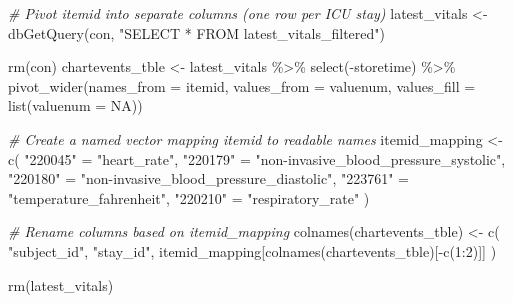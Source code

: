 \documentclass[
]{article}
\newenvironment{Shaded}{\begin{snugshade}}{\end{snugshade}}
\newcommand{\AttributeTok}[1]{\textcolor[rgb]{0.77,0.63,0.00}{#1}}
\newcommand{\CommentTok}[1]{\textcolor[rgb]{0.56,0.35,0.01}{\textit{#1}}}
\newcommand{\ConstantTok}[1]{\textcolor[rgb]{0.00,0.00,0.00}{#1}}
\newcommand{\DecValTok}[1]{\textcolor[rgb]{0.00,0.00,0.81}{#1}}
\newcommand{\FunctionTok}[1]{\textcolor[rgb]{0.00,0.00,0.00}{#1}}
\newcommand{\NormalTok}[1]{\textcolor[rgb]{0.00,0.00,0.00}{#1}}
\newcommand{\OtherTok}[1]{\textcolor[rgb]{0.56,0.35,0.01}{#1}}
\newcommand{\SpecialCharTok}[1]{\textcolor[rgb]{0.00,0.00,0.00}{#1}}
\newcommand{\StringTok}[1]{\textcolor[rgb]{0.31,0.60,0.02}{#1}}
\begin{document}
\begin{Shaded}
\begin{Highlighting}[]
\CommentTok{\# Pivot \textasciigrave{}itemid\textasciigrave{} into separate columns (one row per ICU stay)}
\NormalTok{latest\_vitals }\OtherTok{\textless{}{-}} \FunctionTok{dbGetQuery}\NormalTok{(con, }\StringTok{"SELECT * FROM latest\_vitals\_filtered"}\NormalTok{)}

\FunctionTok{rm}\NormalTok{(con)}
\NormalTok{chartevents\_tble }\OtherTok{\textless{}{-}}\NormalTok{ latest\_vitals }\SpecialCharTok{\%\textgreater{}\%}
  \FunctionTok{select}\NormalTok{(}\SpecialCharTok{{-}}\NormalTok{storetime) }\SpecialCharTok{\%\textgreater{}\%}
  \FunctionTok{pivot\_wider}\NormalTok{(}\AttributeTok{names\_from =}\NormalTok{ itemid, }\AttributeTok{values\_from =}\NormalTok{ valuenum, }
              \AttributeTok{values\_fill =} \FunctionTok{list}\NormalTok{(}\AttributeTok{valuenum =} \ConstantTok{NA}\NormalTok{))}

\CommentTok{\# Create a named vector mapping \textasciigrave{}itemid\textasciigrave{} to readable names}
\NormalTok{itemid\_mapping }\OtherTok{\textless{}{-}} \FunctionTok{c}\NormalTok{(}
  \StringTok{"220045"} \OtherTok{=} \StringTok{"heart\_rate"}\NormalTok{,}
  \StringTok{"220179"} \OtherTok{=} \StringTok{"non{-}invasive\_blood\_pressure\_systolic"}\NormalTok{,}
  \StringTok{"220180"} \OtherTok{=} \StringTok{"non{-}invasive\_blood\_pressure\_diastolic"}\NormalTok{,}
  \StringTok{"223761"} \OtherTok{=} \StringTok{"temperature\_fahrenheit"}\NormalTok{,}
  \StringTok{"220210"} \OtherTok{=} \StringTok{"respiratory\_rate"}
\NormalTok{)}

\CommentTok{\# Rename columns based on \textasciigrave{}itemid\_mapping\textasciigrave{}}
\FunctionTok{colnames}\NormalTok{(chartevents\_tble) }\OtherTok{\textless{}{-}} \FunctionTok{c}\NormalTok{(}
  \StringTok{"subject\_id"}\NormalTok{, }\StringTok{"stay\_id"}\NormalTok{,}
\NormalTok{  itemid\_mapping[}\FunctionTok{colnames}\NormalTok{(chartevents\_tble)[}\SpecialCharTok{{-}}\FunctionTok{c}\NormalTok{(}\DecValTok{1}\SpecialCharTok{:}\DecValTok{2}\NormalTok{)]]}
\NormalTok{) }

\FunctionTok{rm}\NormalTok{(latest\_vitals)}
\end{Highlighting}
\end{Shaded}
\end{document}
